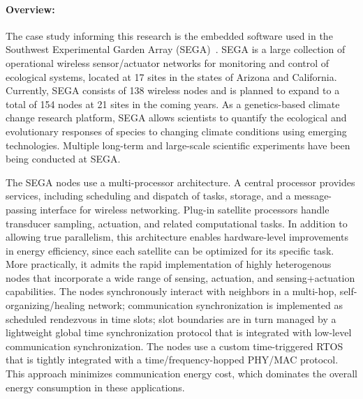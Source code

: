 
\paragraph{Overview:}

The case study informing this research is the embedded software used in the Southwest Experimental Garden Array (SEGA)~\cite{ClaEtAl11,GhoEtAl2014,BelEtAl2015}.
SEGA is a large collection of operational wireless sensor/actuator networks for monitoring and control of ecological systems, located at 17 sites in the states of Arizona and California.
Currently, SEGA consists of 138 wireless nodes and is planned to expand to a total of 154 nodes at 21 sites in the coming years.
As a genetics-based climate change research platform, SEGA allows scientists to quantify the ecological and evolutionary responses of species to changing climate conditions using emerging technologies.
Multiple long-term and large-scale scientific experiments have been being conducted at SEGA.


The SEGA nodes use a multi-processor architecture.
A central processor provides services, including scheduling and dispatch of tasks, storage, and a message-passing interface for wireless networking.
Plug-in satellite processors handle transducer sampling, actuation, and related computational tasks.
In addition to allowing true parallelism, this architecture enables hardware-level improvements in energy efficiency, since each satellite can be optimized for its specific task.
More practically, it admits the rapid implementation of highly heterogenous nodes that incorporate a wide range of sensing, actuation, and sensing+actuation capabilities.
%
The nodes synchronously interact with neighbors in a multi-hop, self-organizing/healing network; communication synchronization is implemented as scheduled rendezvous in time slots; slot boundaries are in turn managed by a lightweight global time synchronization protocol that is integrated with low-level communication synchronization.
The nodes use a custom time-triggered RTOS that is tightly integrated with a time/frequency-hopped PHY/MAC protocol.
This approach %
minimizes communication energy cost, which dominates the overall energy consumption in these applications. 

